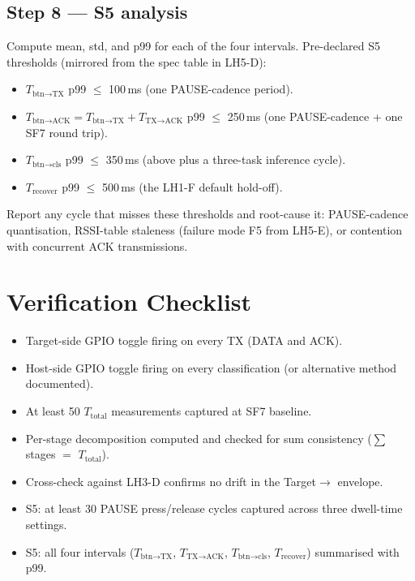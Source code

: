 \documentclass[11pt,letterpaper]{article}
\begin{document}
\subsection{Step 8 --- S5 analysis}
Compute mean, std, and p99 for each of the four intervals. Pre-declared S5 thresholds (mirrored from the spec table in LH5-D):
\begin{itemize}[leftmargin=2em]
	\item $T_{\text{btn}\to\text{TX}}$ p99 $\leq$ 100\,ms (one PAUSE-cadence period).
	\item $T_{\text{btn}\to\text{ACK}} = T_{\text{btn}\to\text{TX}} + T_{\text{TX}\to\text{ACK}}$ p99 $\leq$ 250\,ms (one PAUSE-cadence + one SF7 round trip).
	\item $T_{\text{btn}\to\text{cls}}$ p99 $\leq$ 350\,ms (above plus a three-task inference cycle).
	\item $T_{\text{recover}}$ p99 $\leq$ 500\,ms (the LH1-F default hold-off).
\end{itemize}

Report any cycle that misses these thresholds and root-cause it: PAUSE-cadence quantisation, RSSI-table staleness (failure mode F5 from LH5-E), or contention with concurrent ACK transmissions.

\section{Verification Checklist}
\begin{itemize}[leftmargin=2em]
	\item[$\square$] Target-side \mbox{GPIO} toggle firing on every \mbox{TX} (DATA and ACK).
	\item[$\square$] Host-side \mbox{GPIO} toggle firing on every classification (or alternative method documented).
	\item[$\square$] At least 50 $T_{\text{total}}$ measurements captured at SF7 baseline.
	\item[$\square$] Per-stage decomposition computed and checked for sum consistency ($\sum$ stages $=$ $T_{\text{total}}$).
	\item[$\square$] Cross-check against LH3-D confirms no drift in the Target$\to$\FPGA{} envelope.
	\item[$\square$] S5: at least 30 PAUSE press/release cycles captured across three dwell-time settings.
	\item[$\square$] S5: all four intervals ($T_{\text{btn}\to\text{TX}}$, $T_{\text{TX}\to\text{ACK}}$, $T_{\text{btn}\to\text{cls}}$, $T_{\text{recover}}$) summarised with p99.
\end{itemize}
\end{document}
